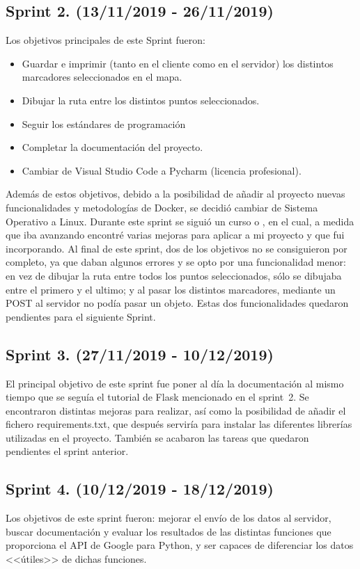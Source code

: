 \subsection{Sprint 2. (13/11/2019 - 26/11/2019)}
Los objetivos principales de este Sprint fueron: 
\begin{itemize}
	\item Guardar e imprimir (tanto en el cliente como en el servidor) los distintos marcadores seleccionados en el mapa.
	\item Dibujar la ruta entre los distintos puntos seleccionados.
	\item Seguir los estándares de programación
	\item Completar la documentación del proyecto.
	\item Cambiar de Visual Studio Code a Pycharm (licencia profesional).
\end{itemize}
Además de estos objetivos, debido a la posibilidad de añadir al proyecto nuevas funcionalidades y metodologías de Docker, se decidió cambiar de Sistema Operativo a Linux.
Durante este sprint se siguió un curso o \cite{tutorial sobre Flask de Miguel Grinberg}, en el cual, a medida que iba avanzando encontré varias mejoras para aplicar a mi proyecto y que fui incorporando.
Al final de este sprint, dos de los objetivos no se consiguieron por completo, ya que daban algunos errores y se opto por una funcionalidad menor: en vez de dibujar la ruta entre todos los puntos seleccionados, sólo se dibujaba entre el primero y el ultimo; y al pasar los distintos marcadores, mediante un POST al servidor no podía pasar un objeto. Estas dos funcionalidades quedaron pendientes para el siguiente Sprint.

\subsection{Sprint 3. (27/11/2019 - 10/12/2019)}
El principal objetivo de este sprint fue poner al día la documentación al mismo tiempo que se seguía el tutorial de Flask mencionado en el sprint~2.
Se encontraron distintas mejoras para realizar, así como la posibilidad de añadir el fichero requirements.txt, que después serviría para instalar las diferentes librerías utilizadas en el proyecto.
También se acabaron las tareas que quedaron pendientes el sprint anterior.

\subsection{Sprint 4. (10/12/2019 - 18/12/2019)}
Los objetivos de este sprint fueron: mejorar el envío de los datos al servidor, buscar documentación y evaluar los resultados de las distintas funciones que proporciona el API de Google para Python, y ser capaces de diferenciar los datos <<útiles>> de dichas funciones.

